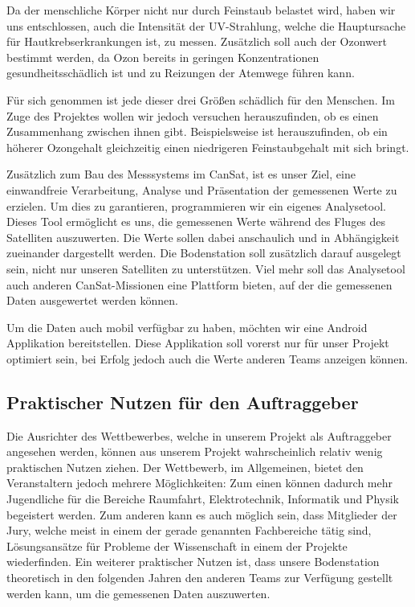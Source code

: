 Da der menschliche Körper nicht nur durch Feinstaub belastet wird, haben wir uns entschlossen, auch die Intensität der UV-Strahlung, welche die Hauptursache für Hautkrebserkrankungen ist, zu messen. Zusätzlich soll auch der Ozonwert bestimmt werden, da Ozon bereits in geringen Konzentrationen gesundheitsschädlich ist und zu Reizungen der Atemwege führen kann.

Für sich genommen ist jede dieser drei Größen schädlich für den Menschen. Im Zuge des Projektes wollen wir jedoch versuchen herauszufinden, ob es einen Zusammenhang zwischen ihnen gibt. Beispielsweise ist herauszufinden, ob ein höherer Ozongehalt gleichzeitig einen niedrigeren Feinstaubgehalt mit sich bringt.

Zusätzlich zum Bau des Messsystems im CanSat, ist es unser Ziel, eine einwandfreie Verarbeitung, Analyse und Präsentation der gemessenen Werte zu erzielen. Um dies zu garantieren, programmieren wir ein eigenes Analysetool. Dieses Tool ermöglicht es uns, die gemessenen Werte während des Fluges des Satelliten auszuwerten. Die Werte sollen dabei anschaulich und in Abhängigkeit zueinander dargestellt werden. Die Bodenstation soll zusätzlich darauf ausgelegt sein, nicht nur unseren Satelliten zu unterstützen. Viel mehr soll das Analysetool auch anderen CanSat-Missionen eine Plattform bieten, auf der die gemessenen Daten ausgewertet werden können.

Um die Daten auch mobil verfügbar zu haben, möchten wir eine Android Applikation bereitstellen. Diese Applikation soll vorerst nur für unser Projekt optimiert sein, bei Erfolg jedoch auch die Werte anderen Teams anzeigen können.

\subsection{Praktischer Nutzen für den Auftraggeber}
Die Ausrichter des Wettbewerbes, welche in unserem Projekt als Auftraggeber angesehen werden, können aus unserem Projekt wahrscheinlich relativ wenig praktischen Nutzen ziehen. Der Wettbewerb, im Allgemeinen, bietet den Veranstaltern jedoch mehrere Möglichkeiten: Zum einen können dadurch mehr Jugendliche für die Bereiche Raumfahrt, Elektrotechnik, Informatik und Physik begeistert werden. Zum anderen kann es auch möglich sein, dass Mitglieder der Jury, welche meist in einem der gerade genannten Fachbereiche tätig sind, Lösungsansätze für Probleme der Wissenschaft in einem der Projekte wiederfinden. Ein weiterer praktischer Nutzen ist, dass unsere Bodenstation theoretisch in den folgenden Jahren den anderen Teams zur Verfügung gestellt werden kann, um die gemessenen Daten auszuwerten.


